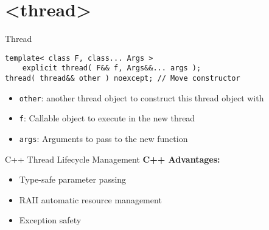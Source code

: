 \section{<thread>}

\begin{frame}[fragile]{Thread}
    \begin{verbatim}
template< class F, class... Args >
    explicit thread( F&& f, Args&&... args );
thread( thread&& other ) noexcept; // Move constructor
    \end{verbatim}
    \begin{itemize}
        \item \texttt{other}: another thread object to construct this thread object with
        \item \texttt{f}: Callable object to execute in the new thread
        \item \texttt{args}: Arguments to pass to the new function
    \end{itemize}
\end{frame}



\begin{frame}[fragile]{C++ Thread Lifecycle Management}
	\textbf{C++ Advantages:}
	\begin{itemize}
		\item Type-safe parameter passing
		\item RAII automatic resource management
		\item Exception safety
	\end{itemize}
\end{frame}


